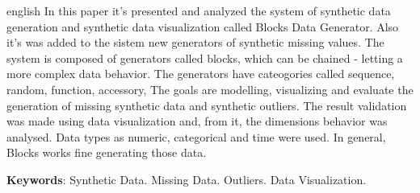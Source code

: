 \documentclass[
	12pt,				%
	openright,			%
	twoside,			%
	a4paper,			%
	english,			%
	brazil				%
	]{abntex2}
\newcommand{\listofquadrosname}{Lista de quadros}
\begin{document}
\begin{resumo}[Abstract]
 \begin{otherlanguage*}{english}
   In this paper it's presented and analyzed the system of synthetic data generation and synthetic data visualization called Blocks Data Generator.
   Also it's was added to the sistem new generators of synthetic missing values.
   The system is composed of generators called blocks, which can be chained - letting a more complex data behavior.
   The generators have cateogories called sequence, random, function, accessory, 
   The goals are modelling, visualizing and evaluate the generation of missing synthetic data and synthetic outliers.
   The result validation was made using data visualization and, from it, the dimensions behavior was analysed.
   Data types as numeric, categorical and time were used.
   In general, Blocks works fine generating those data.  

   \vspace{\onelineskip}
 
   \noindent 
   \textbf{Keywords}: Synthetic Data. Missing Data. Outliers. Data Visualization.
 \end{otherlanguage*}
\end{resumo}


\listoffigures*
\cleardoublepage


\listoftables*
\cleardoublepage


\end{document}
